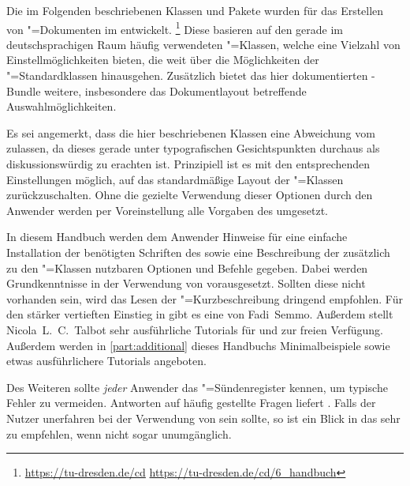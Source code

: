 \addchap*{\prefacename}
Die im Folgenden beschriebenen Klassen und Pakete wurden für das Erstellen von 
"=Dokumenten im \TUDCD entwickelt.%
\footnote{%
  \url{https://tu-dresden.de/cd}\qquad
  \url{https://tu-dresden.de/cd/6_handbuch}%
}
Diese basieren auf den gerade im deutschsprachigen Raum häufig verwendeten 
\KOMAScript"=Klassen, welche eine Vielzahl von Einstellmöglichkeiten bieten, 
die weit über die Möglichkeiten der "=Standardklassen 
hinausgehen. Zusätzlich bietet das hier dokumentierten \TUDScript-Bundle 
weitere, insbesondere das Dokumentlayout betreffende Auswahlmöglichkeiten.

Es sei angemerkt, dass die hier beschriebenen Klassen eine Abweichung vom 
\TUDCD zulassen, da dieses gerade unter typografischen Gesichtspunkten 
durchaus als diskussionswürdig zu erachten ist. Prinzipiell ist es mit den 
entsprechenden Einstellungen möglich, auf das standardmäßige Layout der 
\KOMAScript"=Klassen zurückzuschalten. Ohne die gezielte Verwendung dieser 
Optionen durch den Anwender werden per Voreinstellung alle Vorgaben des \CDs 
umgesetzt.

In diesem Handbuch werden dem Anwender Hinweise für eine einfache Installation 
der benötigten Schriften des \CDs sowie eine Beschreibung der zusätzlich zu den 
\KOMAScript"=Klassen nutzbaren Optionen und Befehle gegeben. Dabei werden 
Grundkenntnisse in der Verwendung von  vorausgesetzt. Sollten 
diese nicht vorhanden sein, wird das Lesen der "=Kurzbeschreibung
dringend empfohlen. Für den stärker vertieften Einstieg in  gibt 
es eine  von 
Fadi~Semmo. Außerdem stellt Nicola~L.~C.~Talbot sehr ausführliche Tutorials für 
und  zur 
freien Verfügung. Außerdem werden in \autoref{part:additional} dieses Handbuchs 
Minimalbeispiele sowie etwas ausführlichere Tutorials angeboten.

Des Weiteren sollte \emph{jeder} Anwender das "=Sündenregister 
kennen, um typische Fehler zu vermeiden. Antworten auf häufig gestellte Fragen 
liefert . Falls der 
Nutzer unerfahren bei der Verwendung von \KOMAScript{} sein sollte, so ist ein 
Blick in das  sehr zu empfehlen, wenn nicht 
sogar unumgänglich.

